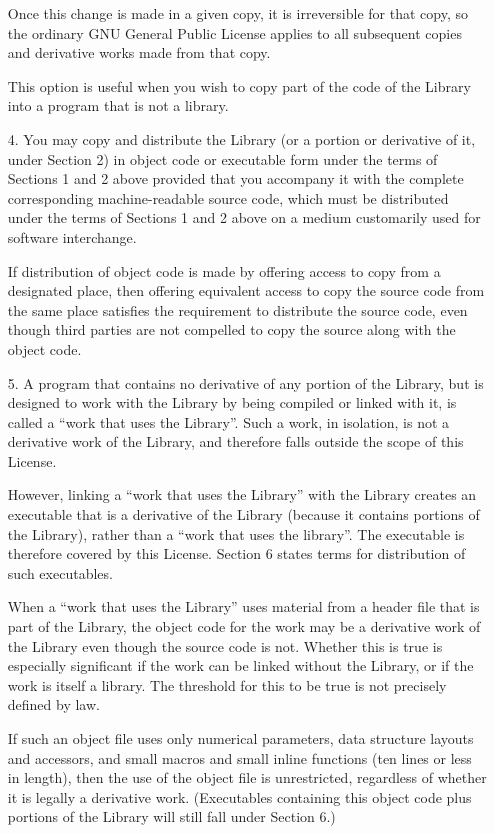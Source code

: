 \begin{multicols}{3}
\begin{itemize}
   Once this change is made in a given copy, it is irreversible for that
   copy, so the ordinary GNU General Public License applies to all
   subsequent copies and derivative works made from that copy.

   This option is useful when you wish to copy part of the code of the
   Library into a program that is not a library.
   
 \item[4.] You may copy and distribute the Library (or a portion or
   derivative of it, under Section 2) in object code or executable
   form under the terms of Sections 1 and 2 above provided that you
   accompany it with the complete corresponding machine-readable
   source code, which must be distributed under the terms of Sections
   1 and 2 above on a medium customarily used for software
   interchange.

   If distribution of object code is made by offering access to copy from a
   designated place, then offering equivalent access to copy the source
   code from the same place satisfies the requirement to distribute the
   source code, even though third parties are not compelled to copy the
   source along with the object code.
   
 \item[5.] A program that contains no derivative of any portion of the
   Library, but is designed to work with the Library by being compiled
   or linked with it, is called a ``work that uses the Library''. Such a
   work, in isolation, is not a derivative work of the Library, and
   therefore falls outside the scope of this License.

   However, linking a ``work that uses the Library'' with the Library creates
   an executable that is a derivative of the Library (because it contains
   portions of the Library), rather than a ``work that uses the
   library''. The executable is therefore covered by this License. Section 6
   states terms for distribution of such executables.

   When a ``work that uses the Library'' uses material from a header file
   that is part of the Library, the object code for the work may be a
   derivative work of the Library even though the source code is
   not. Whether this is true is especially significant if the work can be
   linked without the Library, or if the work is itself a library. The
   threshold for this to be true is not precisely defined by law.

   If such an object file uses only numerical parameters, data structure
   layouts and accessors, and small macros and small inline functions (ten
   lines or less in length), then the use of the object file is
   unrestricted, regardless of whether it is legally a derivative
   work. (Executables containing this object code plus portions of the
   Library will still fall under Section 6.)


\end{itemize}
\end{multicols}
